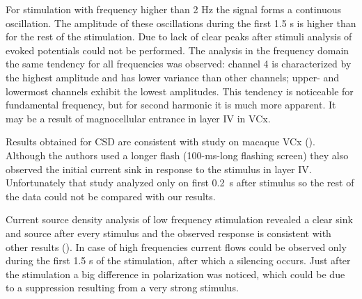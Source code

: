 \documentclass{pracalicmgr}
\begin{document}
    For stimulation with frequency higher than 2 Hz the signal forms a continuous oscillation. The amplitude of these oscillations during the first 1.5 s is higher than for the rest of the stimulation. Due to lack of clear peaks after stimuli analysis of evoked potentials could not be performed. The analysis in the frequency domain the same tendency for all frequencies was observed: channel 4 is characterized by the highest amplitude and has lower variance than other channels; upper- and lowermost channels exhibit the lowest amplitudes. This tendency is noticeable for fundamental frequency, but for second harmonic it is much more apparent. It may be a result of magnocellular entrance in layer IV in VCx.
    
    Results obtained for CSD are consistent with study on macaque VCx (\cite{maier2011}). Although the authors used a longer flash (100-ms-long flashing screen) they also observed the initial current sink in response to the stimulus in layer IV. Unfortunately that study analyzed only on first 0.2~s after stimulus so the rest of the data could not be compared with our results. 
    
    Current source density analysis of low frequency stimulation revealed a clear sink and source after every stimulus and the observed response is consistent with other results (\cite{kozai, maier2010}). In case of high frequencies current flows could be observed only during the first 1.5 s of the stimulation, after which a silencing occurs. Just after the stimulation a big difference in polarization was noticed, which could be due to a suppression resulting from a very strong stimulus.
    

\printbibliography[heading=bibintoc]
\end{document}
